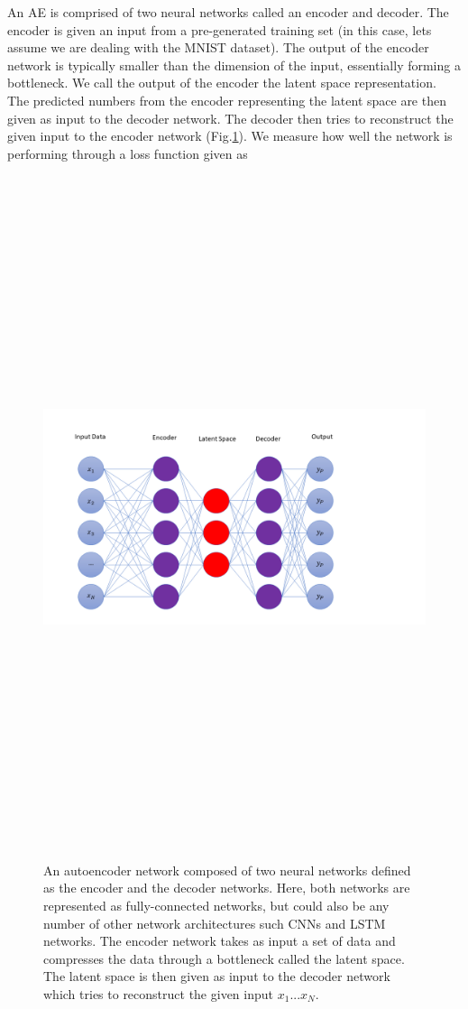 An \ac{AE} is 
comprised of two neural networks called an 
encoder and decoder. The encoder is given an input 
from a pre-generated training set (in this case, lets assume 
we are dealing with the MNIST dataset). The output of the 
encoder network is typically smaller than the dimension of 
the input, essentially forming a bottleneck. 
We call the output of the encoder the latent space representation. 
The predicted numbers from the encoder representing the latent 
space are then given as input to the decoder network. The 
decoder then tries to reconstruct the given input to the 
encoder network (Fig.\ref{fig:autoencoder_diagram}). We measure how well the network is performing 
through a loss function given as 

\begin{figure}
    \centering
    \includegraphics[width=19cm,height=20cm,keepaspectratio]{figures/autoencoder_diagram.png}
    \caption{An autoencoder network composed of two neural networks defined as the encoder 
    and the decoder networks. Here, both networks are represented as fully-connected networks, but could also be any number of other network architectures such \ac{CNN}s and \ac{LSTM} networks. The encoder network takes as input a set of data and compresses the data  
    through a bottleneck called the latent space. The latent space is then given as input to the decoder network which tries to reconstruct the given input $x_1 ... x_N$.}
    \label{fig:autoencoder_diagram}
\end{figure}

